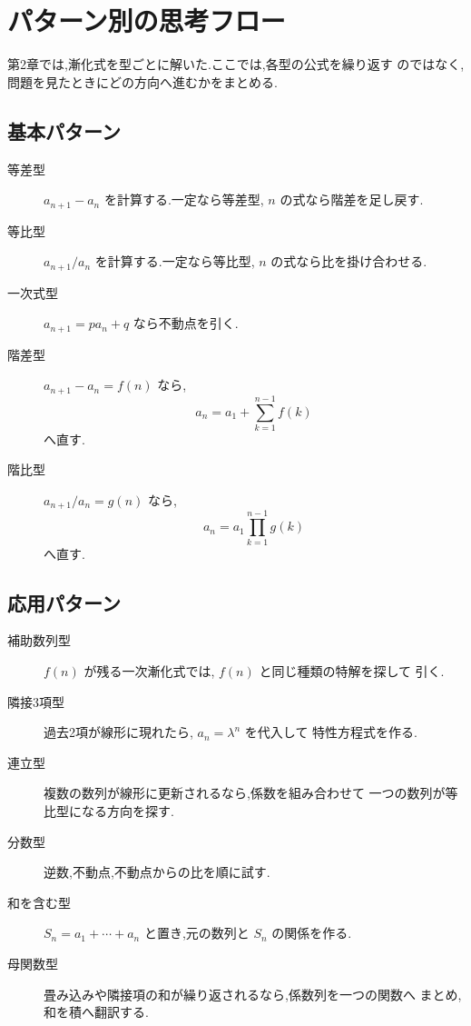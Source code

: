 
\section{パターン別の思考フロー}

第2章では,漸化式を型ごとに解いた.ここでは,各型の公式を繰り返す
のではなく,問題を見たときにどの方向へ進むかをまとめる.

\subsection{基本パターン}

\begin{description}
  \item[等差型]
    $a_{n+1}-a_n$ を計算する.一定なら等差型,
    $n$ の式なら階差を足し戻す.
  \item[等比型]
    $a_{n+1}/a_n$ を計算する.一定なら等比型,
    $n$ の式なら比を掛け合わせる.
  \item[一次式型]
    $a_{n+1}=pa_n+q$ なら不動点を引く.
  \item[階差型]
    $a_{n+1}-a_n=f(n)$ なら,
    \[
      a_n=a_1+\sum_{k=1}^{n-1}f(k)
    \]
    へ直す.
  \item[階比型]
    $a_{n+1}/a_n=g(n)$ なら,
    \[
      a_n=a_1\prod_{k=1}^{n-1}g(k)
    \]
    へ直す.
\end{description}

\subsection{応用パターン}

\begin{description}
  \item[補助数列型]
    $f(n)$ が残る一次漸化式では, $f(n)$ と同じ種類の特解を探して
    引く.
  \item[隣接3項型]
    過去2項が線形に現れたら, $a_n=\lambda^n$ を代入して
    特性方程式を作る.
  \item[連立型]
    複数の数列が線形に更新されるなら,係数を組み合わせて
    一つの数列が等比型になる方向を探す.
  \item[分数型]
    逆数,不動点,不動点からの比を順に試す.
  \item[和を含む型]
    $S_n=a_1+\cdots+a_n$ と置き,元の数列と $S_n$ の関係を作る.
  \item[母関数型]
    畳み込みや隣接項の和が繰り返されるなら,係数列を一つの関数へ
    まとめ,和を積へ翻訳する.
\end{description}

